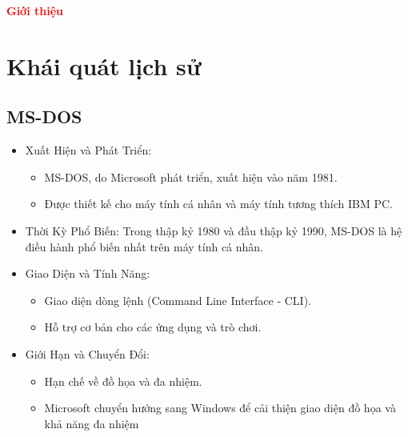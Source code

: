 \documentclass[12pt,a4paper]{article}
\begin{document}
\tableofcontents
\newpage
{}
\begin{center}
	{\fontsize{30}{14}\selectfont \textbf{\textcolor{red}{Giới thiệu}}}
\end{center}

\section{Khái quát lịch sử}
\subsection{MS-DOS}
\begin{itemize}
	\item Xuất Hiện và Phát Triển:
	\begin{itemize}
		\item MS-DOS, do Microsoft phát triển, xuất hiện vào năm 1981.
		\item Được thiết kế cho máy tính cá nhân và máy tính tương thích IBM PC.
	\end{itemize}
	\item Thời Kỳ Phổ Biến: Trong thập kỷ 1980 và đầu thập kỷ 1990, MS-DOS là hệ điều hành phổ biến nhất trên máy tính cá nhân.
	\item Giao Diện và Tính Năng:
	\begin{itemize}
		\item Giao diện dòng lệnh (Command Line Interface - CLI).
		\item Hỗ trợ cơ bản cho các ứng dụng và trò chơi.
	\end{itemize}
	\item Giới Hạn và Chuyển Đổi:
	\begin{itemize}
		\item Hạn chế về đồ họa và đa nhiệm.
		\item Microsoft chuyển hướng sang Windows để cải thiện giao diện đồ họa và khả năng đa nhiệm
	\end{itemize}
\end{itemize}
\end{document}
